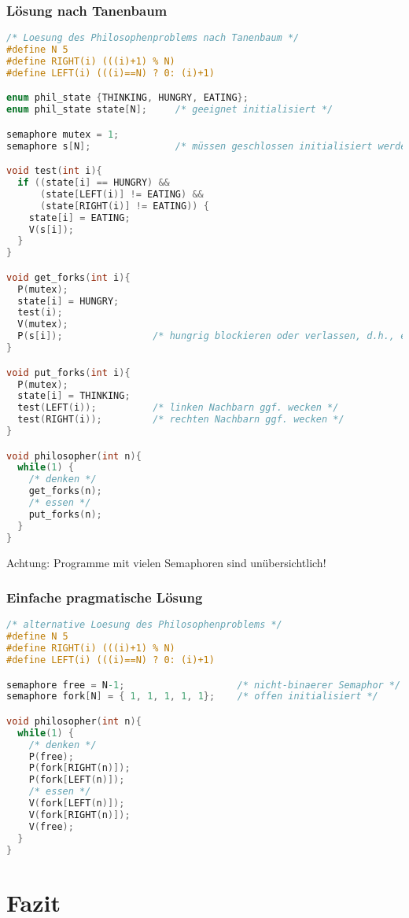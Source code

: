 \subsubsection*{Lösung nach Tanenbaum}
\begin{lstlisting}[language=C]
/* Loesung des Philosophenproblems nach Tanenbaum */
#define N 5
#define RIGHT(i) (((i)+1) % N)
#define LEFT(i) (((i)==N) ? 0: (i)+1)

enum phil_state {THINKING, HUNGRY, EATING};
enum phil_state state[N];     /* geeignet initialisiert */

semaphore mutex = 1;  
semaphore s[N];               /* müssen geschlossen initialisiert werden */

void test(int i){
  if ((state[i] == HUNGRY) &&
      (state[LEFT(i)] != EATING) &&
      (state[RIGHT(i)] != EATING)) {
    state[i] = EATING;
    V(s[i]);
  }
}

void get_forks(int i){
  P(mutex);
  state[i] = HUNGRY;
  test(i);
  V(mutex);
  P(s[i]);                /* hungrig blockieren oder verlassen, d.h., essen */
}

void put_forks(int i){
  P(mutex);
  state[i] = THINKING;
  test(LEFT(i));          /* linken Nachbarn ggf. wecken */
  test(RIGHT(i));         /* rechten Nachbarn ggf. wecken */
}

void philosopher(int n){
  while(1) {
    /* denken */
    get_forks(n);
    /* essen */
    put_forks(n); 
  }
}
\end{lstlisting}
Achtung: Programme mit vielen Semaphoren sind unübersichtlich!

\subsubsection*{Einfache pragmatische Lösung}
\begin{lstlisting}[language=C]
/* alternative Loesung des Philosophenproblems */
#define N 5
#define RIGHT(i) (((i)+1) % N)
#define LEFT(i) (((i)==N) ? 0: (i)+1)

semaphore free = N-1;                    /* nicht-binaerer Semaphor */  
semaphore fork[N] = { 1, 1, 1, 1, 1};    /* offen initialisiert */

void philosopher(int n){
  while(1) {
    /* denken */
    P(free);
    P(fork[RIGHT(n)]);
    P(fork[LEFT(n)]);
    /* essen */
    V(fork[LEFT(n)]);
    V(fork[RIGHT(n)]);
    V(free);
  }
}
\end{lstlisting}

\section{Fazit}
